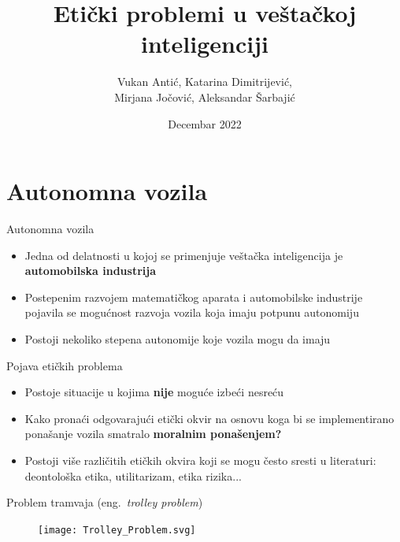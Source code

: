 \documentclass[14pt, aspectratio=169]{beamer}
\title{Etički problemi u veštačkoj inteligenciji}
\author{Vukan Antić, Katarina Dimitrijević, \\ Mirjana Jočović, Aleksandar Šarbajić}
\date{Decembar 2022}
\begin{document}
\maketitle

\section{Autonomna vozila}

\begin{frame}{Autonomna vozila}
    \begin{itemize}
        \item Jedna od delatnosti u kojoj se primenjuje veštačka inteligencija je \textbf{automobilska industrija}
    \end{itemize}
    \begin{itemize}
        \item Postepenim razvojem matematičkog aparata i automobilske industrije pojavila se mogućnost razvoja vozila koja imaju potpunu autonomiju
    \end{itemize}
    \begin{itemize}
        \item Postoji nekoliko stepena autonomije koje vozila mogu da imaju
    \end{itemize}
\end{frame}

\begin{frame}{Pojava etičkih problema}
    \begin{itemize}
        \item <1-> Postoje situacije u kojima \textbf{nije} moguće izbeći nesreću
    \end{itemize}
    \begin{itemize}
        \item <2-> Kako pronaći odgovarajući etički okvir na osnovu koga bi se implementirano ponašanje vozila smatralo \textbf{moralnim ponašenjem? }
    \end{itemize}
    \begin{itemize}
        \item <3-> Postoji više različitih etičkih okvira koji se mogu često sresti u literaturi: deontološka etika, utilitarizam, etika rizika...
    \end{itemize}
\end{frame}

\begin{frame}{Problem tramvaja (eng.~{\em trolley problem})}
   \begin{figure}[h!]
        \begin{center}
            \texttt{[image: Trolley\_Problem.svg]}
        \end{center}
        \label{fig:minAI}
    \end{figure}
\end{frame}
\end{document}
